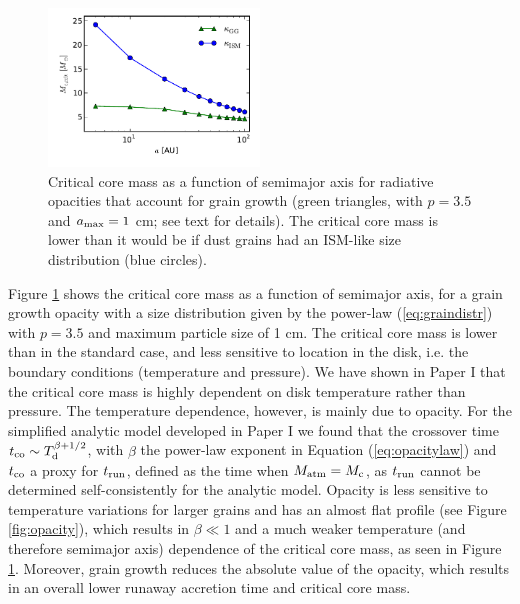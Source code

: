 \documentclass[apj]{emulateapj}
\newcommand{\co}{_{\rm c}}
\begin{document}
\begin{figure}[h!]
\centering
\includegraphics[width=0.5\textwidth]{../../figs/ModelAtmospheres/RadSelfGravRealEOS/PaperFigs/Mcrit_vs_a_gg.pdf}
\caption{Critical core mass as a function of semimajor axis for radiative opacities that account for grain growth (green triangles, with $p=3.5$ and $a_{\rm max}=1$ cm; see text for details). The critical core mass is lower than it would be if dust grains had an ISM-like size distribution (blue circles).}
\label{fig:Mcritvsagg}
\end{figure}

Figure \ref{fig:Mcritvsagg} shows the critical core mass as a function of semimajor axis, for a grain growth opacity with a size distribution given by the power-law (\ref{eq:graindistr}) with $p=3.5$ and maximum particle size of 1 cm. The critical core mass is lower than in the standard case, and less sensitive to location in the disk, i.e. the boundary conditions (temperature and pressure). We have shown in Paper I that the critical core mass is highly dependent on disk temperature rather than pressure. The temperature dependence, however, is mainly due to opacity. For the simplified analytic model developed in Paper I we found that the crossover time $t_{\rm co} \sim T_{\rm d}^{\beta+1/2}$, with $\beta$ the power-law exponent in Equation (\ref{eq:opacitylaw}) and $t_{\rm co}$ a proxy for $t_{\rm run}$, defined as the time when $M_{\rm atm}=M\co$, as $t_{\rm run}$ cannot be determined self-consistently for the analytic model. Opacity is less sensitive to temperature variations for larger grains and has an almost flat profile (see Figure \ref{fig:opacity}), which results in $\beta \ll 1$ and a much weaker temperature (and therefore semimajor axis) dependence of the critical core mass, as seen in Figure \ref{fig:Mcritvsagg}. Moreover, grain growth reduces the absolute value of the opacity, which results in an overall lower runaway accretion time and critical core mass. %
\end{document}
